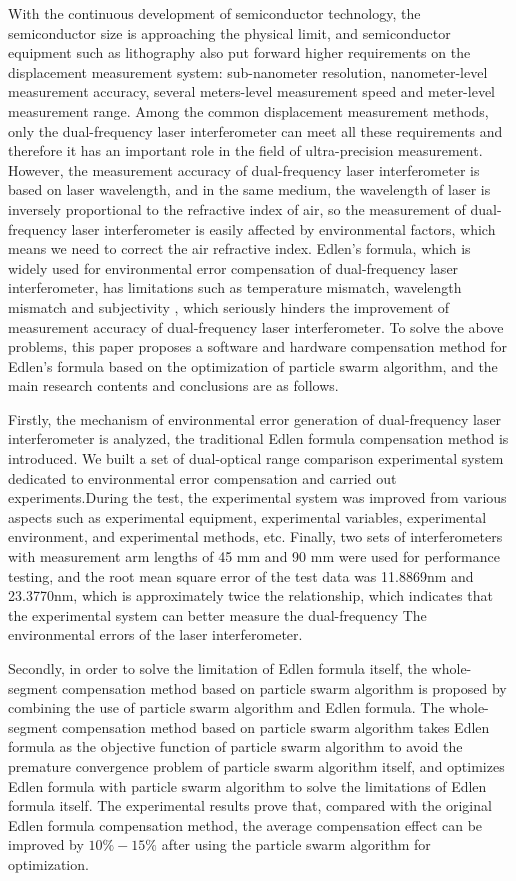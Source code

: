 \begin{abstract*}
  With the continuous development of semiconductor technology, the semiconductor size is approaching the physical limit, and semiconductor equipment such as lithography also put forward higher requirements on the displacement measurement system: sub-nanometer resolution, nanometer-level measurement accuracy, several meters-level measurement speed and meter-level measurement range. Among the common displacement measurement methods, only the dual-frequency laser interferometer can meet all these requirements and therefore it has an important role in the field of ultra-precision measurement. However, the measurement accuracy of dual-frequency laser interferometer is based on laser wavelength, and in the same medium, the wavelength of laser is inversely proportional to the refractive index of air, so the measurement of dual-frequency laser interferometer is easily affected by environmental factors, which means we need to correct the air refractive index. Edlen's formula, which is widely used for environmental error compensation of dual-frequency laser interferometer, has limitations such as temperature mismatch, wavelength mismatch and subjectivity , which seriously hinders the improvement of measurement accuracy of dual-frequency laser interferometer. To solve the above problems, this paper proposes a software and hardware compensation method for Edlen's formula based on the optimization of particle swarm algorithm, and the main research contents and conclusions are as follows.

  Firstly, the mechanism of environmental error generation of dual-frequency laser interferometer is analyzed, the traditional Edlen formula compensation method is introduced. We built a set of dual-optical range comparison experimental system dedicated to environmental error compensation and  carried out experiments.During the test, the experimental system was improved from various aspects such as experimental equipment, experimental variables, experimental environment, and experimental methods, etc. Finally, two sets of interferometers with measurement arm lengths of 45 mm and 90 mm were used for performance testing, and the root mean square error of the test data was 11.8869nm and 23.3770nm, which is approximately twice the relationship, which indicates that the experimental system can better measure the dual-frequency The environmental errors of the laser interferometer.

  Secondly, in order to solve the limitation of Edlen formula itself, the whole-segment compensation method based on particle swarm algorithm is proposed by combining the use of particle swarm algorithm and Edlen formula. The whole-segment compensation method based on particle swarm algorithm takes Edlen formula as the objective function of particle swarm algorithm to avoid the premature convergence problem of particle swarm algorithm itself, and optimizes Edlen formula with particle swarm algorithm to solve the limitations of Edlen formula itself. The experimental results prove that, compared with the original Edlen formula compensation method, the average  compensation effect can be improved by $10\%-15\%$ after using the particle swarm algorithm for optimization.


\end{abstract*}
